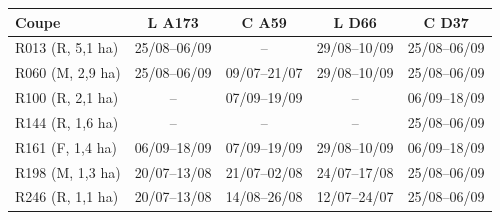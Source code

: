 \begin{tabular}{lcccc}
\toprule
Coupe & L A173 & C A59 & L D66 & C D37 \\
\midrule
R013 (R, 5{,}1 ha) & 25/08--06/09 & -- & 29/08--10/09 & 25/08--06/09 \\
R060 (M, 2{,}9 ha) & 25/08--06/09 & 09/07--21/07 & 29/08--10/09 & 25/08--06/09 \\
R100 (R, 2{,}1 ha) & -- & 07/09--19/09 & -- & 06/09--18/09 \\
R144 (R, 1{,}6 ha) & -- & -- & -- & 25/08--06/09 \\
R161 (F, 1{,}4 ha) & 06/09--18/09 & 07/09--19/09 & 29/08--10/09 & 06/09--18/09 \\
R198 (M, 1{,}3 ha) & 20/07--13/08 & 21/07--02/08 & 24/07--17/08 & 25/08--06/09 \\
R246 (R, 1{,}1 ha) & 20/07--13/08 & 14/08--26/08 & 12/07--24/07 & 25/08--06/09 \\
\bottomrule
\end{tabular}
